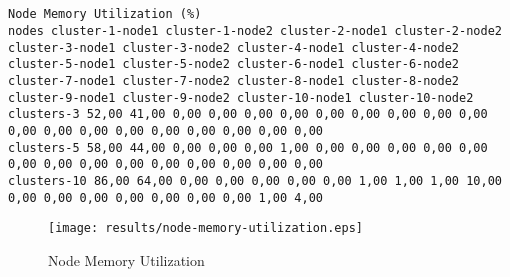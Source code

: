 \documentclass{elsart}
\begin{document}
\subsection{}

\begin{lstlisting}[caption={Node Memory Utilization}]
Node Memory Utilization (%)
nodes cluster-1-node1 cluster-1-node2 cluster-2-node1 cluster-2-node2 cluster-3-node1 cluster-3-node2 cluster-4-node1 cluster-4-node2 cluster-5-node1 cluster-5-node2 cluster-6-node1 cluster-6-node2 cluster-7-node1 cluster-7-node2 cluster-8-node1 cluster-8-node2 cluster-9-node1 cluster-9-node2 cluster-10-node1 cluster-10-node2
clusters-3 52,00 41,00 0,00 0,00 0,00 0,00 0,00 0,00 0,00 0,00 0,00 0,00 0,00 0,00 0,00 0,00 0,00 0,00 0,00 0,00
clusters-5 58,00 44,00 0,00 0,00 0,00 1,00 0,00 0,00 0,00 0,00 0,00 0,00 0,00 0,00 0,00 0,00 0,00 0,00 0,00 0,00
clusters-10 86,00 64,00 0,00 0,00 0,00 0,00 0,00 1,00 1,00 1,00 10,00 0,00 0,00 0,00 0,00 0,00 0,00 0,00 1,00 4,00
\end{lstlisting}

\begin{figure}[ht]
\centering
\texttt{[image: results/node-memory-utilization.eps]}
\caption{Node Memory Utilization}\label{fig:node-memory-utilization.eps}
\end{figure}
\end{document}
